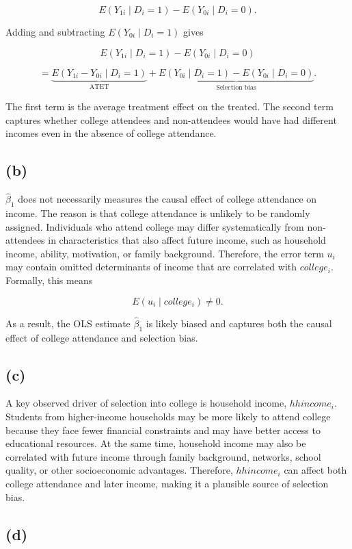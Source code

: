 \documentclass[
]{article}
\begin{document}
\[
E(Y_{1i} \mid D_i = 1) - E(Y_{0i} \mid D_i = 0).
\]

Adding and subtracting \(E(Y_{0i} \mid D_i = 1)\) gives

\[
E(Y_{1i} \mid D_i = 1) - E(Y_{0i} \mid D_i = 0)
\]

\[
=
\underbrace{E(Y_{1i} - Y_{0i} \mid D_i = 1)}_{\text{ATET}}
+
\underbrace{E(Y_{0i} \mid D_i = 1) - E(Y_{0i} \mid D_i = 0)}_{\text{Selection bias}}.
\]

The first term is the average treatment effect on the treated. The
second term captures whether college attendees and non-attendees would
have had different incomes even in the absence of college attendance.

\subsection{(b)}\label{b}

\(\hat{\beta}_1\) does not necessarily measures the causal effect of
college attendance on income. The reason is that college attendance is
unlikely to be randomly assigned. Individuals who attend college may
differ systematically from non-attendees in characteristics that also
affect future income, such as household income, ability, motivation, or
family background. Therefore, the error term \(u_i\) may contain omitted
determinants of income that are correlated with \(college_i\). Formally,
this means

\[
E(u_i \mid college_i) \neq 0.
\]

As a result, the OLS estimate \(\hat{\beta}_1\) is likely biased and
captures both the causal effect of college attendance and selection
bias.

\subsection{(c)}\label{c}

A key observed driver of selection into college is household income,
\(hhincome_i\). Students from higher-income households may be more
likely to attend college because they face fewer financial constraints
and may have better access to educational resources. At the same time,
household income may also be correlated with future income through
family background, networks, school quality, or other socioeconomic
advantages. Therefore, \(hhincome_i\) can affect both college attendance
and later income, making it a plausible source of selection bias.

\subsection{(d)}\label{d}
\end{document}
